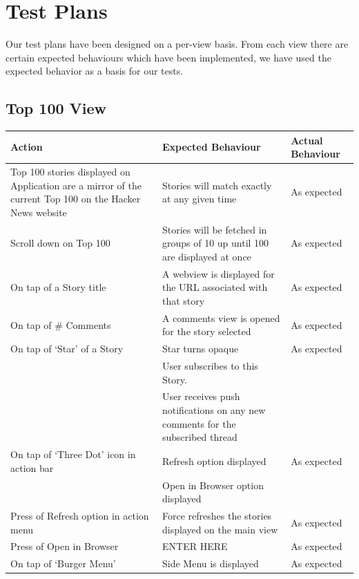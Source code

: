 \documentclass[11pt]{article}
\begin{document}
\section*{Test Plans}

Our test plans have been designed on a per-view basis. From each view there are certain expected behaviours which have been implemented, we have used the expected behavior as a basis for our tests.

\subsection*{Top 100 View}

\begin{center}
    \begin{tabular}{ | p{5cm} | p{5cm} | p{5cm} |}
    \hline
    \textbf{Action} & \textbf{Expected Behaviour} & \textbf{Actual Behaviour} \\
    \hline
    Top 100 stories displayed on Application are a mirror of the current Top 100 on the Hacker News website & Stories will match exactly at any given time & As expected   \\ 	\hline
    Scroll down on Top 100 & Stories will be fetched in groups of 10 up until 100 are displayed at once & As expected \\ 
    \hline
    On tap of a Story title & A webview is displayed for the URL associated with that story & As expected \\
    \hline
	On tap of \# Comments & A comments view is opened for the story selected & As expected \\
	\hline
	
	On tap of ‘Star’ of a Story & Star turns opaque & As expected \\ & User subscribes to this Story. & \\ & User receives push notifications on any new comments for the subscribed thread & \\
	\hline
	On tap of ‘Three Dot’ icon in action bar & Refresh option displayed & As expected \\ & Open in Browser option displayed & \\
	\hline
	Press of Refresh option in action menu & Force refreshes the stories displayed on the main view & As expected \\
	\hline
	Press of Open in Browser & ENTER HERE & As expected \\
	\hline
	On tap of ‘Burger Menu’ & Side Menu is displayed & As expected \\
	\hline
    \end{tabular}
\end{center}
\end{document}

